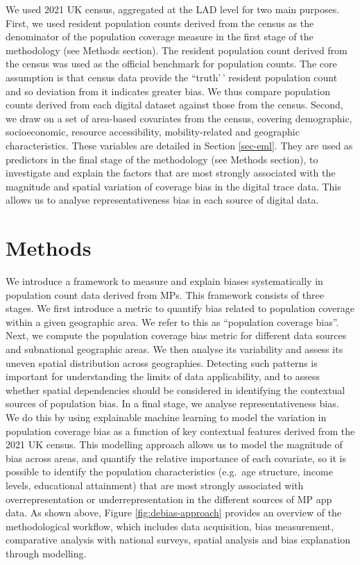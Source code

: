 \documentclass[]{rsos}%
\begin{document}
We used 2021 UK census, aggregated at the LAD level for two main
purposes. First, we used resident population counts derived from the
census as the denominator of the population coverage measure in the
first stage of the methodology (see Methods section). The resident
population count derived from the census was used as the official
benchmark for population counts. The core assumption is that census data
provide the ``truth'\,' resident population count and so deviation from
it indicates greater bias. We thus compare population counts derived
from each digital dataset against those from the census. Second, we draw
on a set of area-based covariates from the census, covering demographic,
socioeconomic, resource accessibility, mobility-related and geographic
characteristics. These variables are detailed in Section \ref{sec-eml}.
They are used as predictors in the final stage of the methodology (see
Methods section), to investigate and explain the factors that are most
strongly associated with the magnitude and spatial variation of coverage
bias in the digital trace data. This allows us to analyse
representativeness bias in each source of digital data.

\section{Methods}\label{methods}

We introduce a framework to measure and explain biases systematically in
population count data derived from MPs. This framework consists of three
stages. We first introduce a metric to quantify bias related to
population coverage within a given geographic area. We refer to this as
``population coverage bias''. Next, we compute the population coverage
bias metric for different data sources and subnational geographic areas.
We then analyse its variability and assess its uneven spatial distribution
across geographies. Detecting such patterns is important for
understanding the limits of data applicability, and to assess whether
spatial dependencies should be considered in identifying the contextual
sources of population bias. In a final stage, we analyse
representativeness bias. We do this by using explainable machine
learning to model the variation in population coverage bias as a
function of key contextual features derived from the 2021 UK census.
This modelling approach allows us to model the magnitude of bias across
areas, and quantify the relative importance of each covariate, so it is
possible to identify the population characteristics (e.g.~age structure,
income levels, educational attainment) that are most strongly associated
with overrepresentation or underrepresentation in the different sources
of MP app data. As shown above, Figure \ref{fig:debias-approach}
provides an overview of the methodological workflow, which includes data
acquisition, bias measurement, comparative analysis with national
surveys, spatial analysis and bias explanation through modelling.
\end{document}
